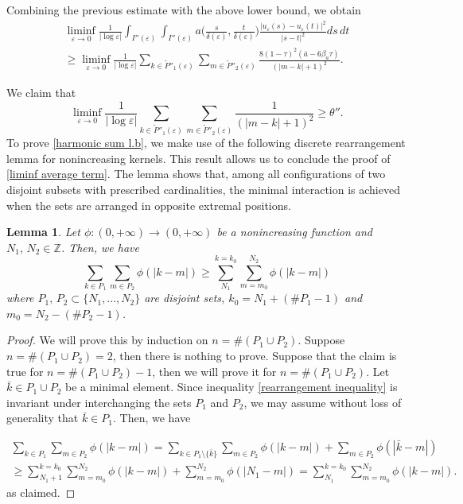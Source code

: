 \documentclass[12pt]{article}
\newtheorem{lemma}[definition]{Lemma}
\numberwithin{equation}{section}
\def\e{\varepsilon}
\begin{document}
Combining the previous estimate with the above lower bound, we obtain
\begin{multline*}
    \liminf_{\e\to0}\frac{1}{\left|\log{\varepsilon}\right|}\int_{I''(\e)}\int_{I''(\e)}a\Big(\frac{s}{\delta(\e) },\frac{t}{\delta(\e) }\Big)\frac{\left|u_{\varepsilon}(s)-u_{\varepsilon}(t)\right|^2}{\left|s-t\right|^2}ds\,dt\\\ge\liminf_{\e\to0}\frac{1}{\left|\log{\varepsilon}\right|}\sum_{k\in\widetilde{P}''_{1}(\varepsilon)}\sum_{m\in\widetilde{P}''_{2}(\varepsilon)}\frac{8(1-\tau)^{2}(\bar{a}-6\beta_{a}\tau)}{(|m-k|+1)^{2}}.
\end{multline*}

We claim that
\begin{equation}\label{harmonic sum l.b}
    \liminf_{\varepsilon\to0}\frac{1}{\left|\log{\varepsilon}\right|}\sum_{k\in\widetilde{P}''_{1}(\varepsilon)}\sum_{m\in\widetilde{P}''_{2}(\varepsilon)}\frac{1}{(|m-k|+1)^2}\ge\theta''.
\end{equation}
To prove \eqref{harmonic sum l.b}, we make use of the following discrete rearrangement lemma for nonincreasing kernels. This result allows us to conclude the proof of \eqref{liminf average term}. The lemma shows that, among all configurations of two disjoint subsets with prescribed cardinalities, the minimal interaction is achieved when the sets are arranged in opposite extremal positions.
 \begin{lemma}\label{rearrangement lemma}
Let $\phi:(0,+\infty)\to(0,+\infty)$ be a nonincreasing function and $N_{1},\,N_{2}\in\mathbb{Z}$. Then, we have 
\begin{equation}\label{rearrangement inequality}
    \sum_{k\in P_{1}}\sum_{m\in P_{2}}\phi(|k-m|)\ge\sum_{N_{1}}^{k=k_{0}}\sum_{m=m_{0}}^{N_{2}}\phi(|k-m|)
\end{equation}
where $P_{1},\,P_{2}\subset\{N_{1},...,N_{2}\}$ are disjoint sets, $k_{0}=N_{1}+(\#P_{1}-1)$ and $m_{0}=N_{2}-(\#P_{2}-1)$.
 \end{lemma}
 \begin{proof}
We will prove this by induction on $n=\#(P_{1}\cup P_{2})$. Suppose $n=\#(P_{1}\cup P_{2})=2$, then there is nothing to prove. Suppose that the claim is true for $n=\#(P_{1}\cup P_{2})-1$, then we will prove it for $n=\#(P_{1}\cup P_{2})$. Let $\bar{k}\in P_{1}\cup P_{2}$ be a minimal element. Since inequality \eqref{rearrangement inequality} is invariant under interchanging the sets $P_{1}$ and $P_{2}$, we may assume without loss of generality that $\bar{k}\in P_{1}$. Then, we have
    
\begin{align*}
\sum_{k\in P_{1}}\sum_{m\in P_{2}}\phi(|k-m|)=\sum_{k\in P_{1}\setminus\{\bar{k}\}}\sum_{m\in P_{2}}\phi(|k-m|)+\sum_{m\in P_{2}}\phi(|\bar{k}-m|)\\\ge\sum_{N_{1}+1}^{k=k_{0}}\sum_{m=m_{0}}^{N_{2}}\phi(|k-m|)+\sum_{m=m_{0}}^{N_{2}}\phi(|N_{1}-m|)=\sum_{N_{1}}^{k=k_{0}}\sum_{m=m_{0}}^{N_{2}}\phi(|k-m|). 
\end{align*}
as claimed.
 \end{proof}
 
\end{document}

